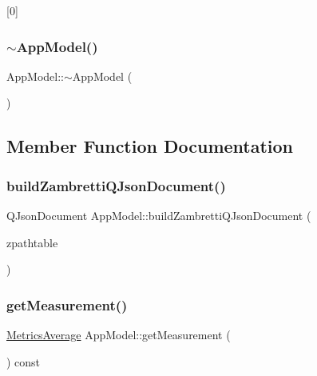 \mbox{[}0\mbox{]} 

\mbox{\label{class_app_model_a67ab3004ccbe2822a8a0abb9fa96ace3}} 
\subsubsection{\texorpdfstring{$\sim$\+App\+Model()}{~AppModel()}}
{\footnotesize\ttfamily App\+Model\+::$\sim$\+App\+Model (\begin{DoxyParamCaption}{ }\end{DoxyParamCaption})}



\subsection{Member Function Documentation}
\mbox{\label{class_app_model_a2e738230cd01012b529adadc3f7c4eae}} 
\subsubsection{\texorpdfstring{build\+Zambretti\+Q\+Json\+Document()}{buildZambrettiQJsonDocument()}}
{\footnotesize\ttfamily Q\+Json\+Document App\+Model\+::build\+Zambretti\+Q\+Json\+Document (\begin{DoxyParamCaption}\item[{Q\+String}]{zpathtable }\end{DoxyParamCaption})}

\mbox{\label{class_app_model_ac9dff9ffdd21a1749d2461c3d2587f6a}} 
\subsubsection{\texorpdfstring{get\+Measurement()}{getMeasurement()}}
{\footnotesize\ttfamily \hyperlink{class_metrics_average}{Metrics\+Average} App\+Model\+::get\+Measurement (\begin{DoxyParamCaption}{ }\end{DoxyParamCaption}) const}

